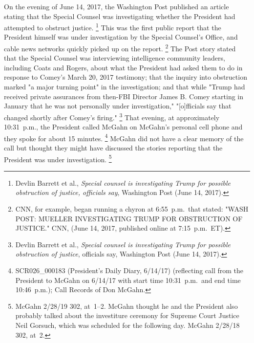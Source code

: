 {On the evening of June 14, 2017, the Washington Post published an article stating that the Special Counsel was investigating whether the President had attempted to obstruct justice.%
\footnote{Devlin Barrett et al., \textit{Special counsel is investigating Trump for possible obstruction of justice, officials say}, Washington Post (June 14, 2017).}
This was the first public report that the President himself was under investigation by the Special Counsel's Office, and cable news networks quickly picked up on the report.%
\footnote{CNN, for example, began running a chyron at 6:55~p.m.\ that stated: "WASH POST: MUELLER INVESTIGATING TRUMP FOR OBSTRUCTION OF JUSTICE." CNN, (June 14, 2017, published online at 7:15~p.m.~ET).}
The Post story stated that the Special Counsel was interviewing intelligence community leaders, including Coats and Rogers, about what the President had asked them to do in response to Comey's March 20, 2017 testimony;
that the inquiry into obstruction marked "a major turning point" in the investigation;
and that while "Trump had received private assurances from then-FBI Director James B. Comey starting in January that he was not personally under investigation," "[o]fficials say that changed shortly after Comey's firing."%
\footnote{Devlin Barrett et al., \textit{Special counsel is investigating Trump for possible obstruction of justice}, officials say, Washington Post (June 14, 2017).}
That evening, at approximately 10:31~p.m., the President called McGahn on McGahn's personal cell phone and they spoke for about 15 minutes.%
\footnote{SCR026\_000183 (President's Daily Diary, 6/14/17) (reflecting call from the President to McGahn on 6/14/17 with start time 10:31~p.m.\ and end time 10:46~p.m.);
Call Records of Don McGahn.}
McGahn did not have a clear memory of the call but thought they might have discussed the stories reporting that the President was under investigation.%
\footnote{McGahn 2/28/19 302, at~1--2.
McGahn thought he and the President also probably talked about the investiture ceremony for Supreme Court Justice Neil Gorsuch, which was scheduled for the following day.
McGahn 2/28/18 302, at~2.}

}
